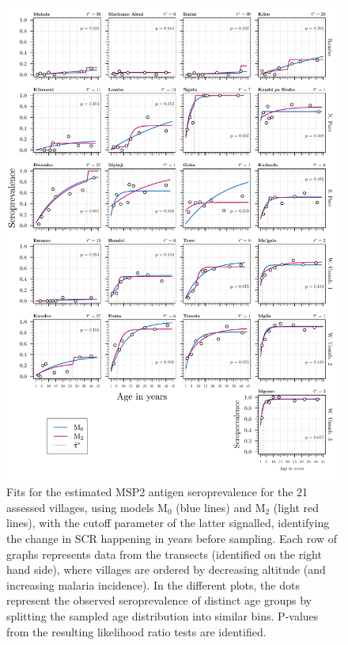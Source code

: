 \begin{appendices}
\begin{figure}[H]
\center
\begin{adjustbox}{width=\linewidth,totalheight=\baselineskip}
\includegraphics[width=\columnwidth]{images/Seroprevalence_M0vM2_msp2.pdf}
\end{adjustbox}
\caption[Estimated MSP2 seroprevalence for models M$_0$ and M$_2$]{Fits for the estimated MSP2 antigen seroprevalence for the 21 assessed villages, using models M$_0$ (blue lines) and M$_2$ (light red lines), with the cutoff parameter of the latter signalled, identifying the change in SCR happening in years before sampling. Each row of graphs represents data from the transects (identified on the right hand side), where villages are ordered by decreasing altitude (and increasing malaria incidence). In the different plots, the dots represent the observed seroprevalence of distinct age groups by splitting the sampled age distribution into similar bins. P-values from the resulting likelihood ratio tests are identified.}
\label{fig:msp2.seroprevalence.M0.M2}
\end{figure}


\end{appendices}
